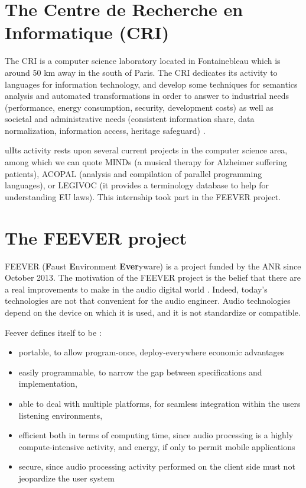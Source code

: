 \section{The Centre de Recherche en Informatique (CRI)}

The CRI is a computer science laboratory located in Fontainebleau which is around 50 km away in the south of Paris. The CRI dedicates its activity to languages for information technology, and develop some techniques for semantics analysis and automated transformations in order to answer to industrial needs (performance, energy consumption, security, development costs) as well as societal and administrative needs (consistent information share, data normalization, information access, heritage safeguard) \cite{criactivity}.

ulIts activity rests upon several current projects in the computer science area, among which we can quote MINDs (a musical therapy for Alzheimer suffering patients), ACOPAL (analysis and compilation of parallel programming languages), or LEGIVOC (it provides a terminology database to help for understanding EU laws).
This internship took part in the FEEVER project.

\section{The FEEVER project}
FEEVER (\textbf{F}aust \textbf{E}nvironment \textbf{Ever}yware) is a project funded by the ANR since October 2013. The motivation of the FEEVER project is the belief that there are a real improvements to make in the audio digital world \cite{feever}. Indeed, today's technologies are not that convenient for the audio engineer. Audio technologies depend on the device on which it is used, and it is not standardize or compatible.

Feever defines itself to be :
\begin{itemize}
    \item portable, to allow program-once, deploy-everywhere economic advantages
    \item easily programmable, to narrow the gap between specifications and implementation,
    \item able to deal with multiple platforms, for seamless integration within the users listening environments,
    \item efficient both in terms of computing time, since audio processing is a highly compute-intensive activity, and energy, if only to permit mobile applications
    \item secure, since audio processing activity performed on the client side must not jeopardize the user system
\end{itemize}
\cite{feever}

